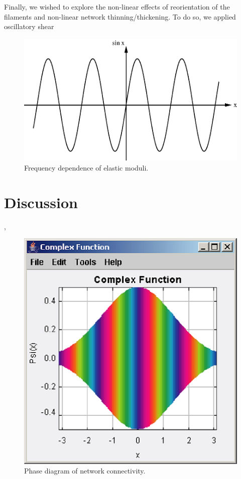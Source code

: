 \documentclass[prb,11pt]{revtex4-1}
\begin{document}
Finally, we wished to explore the non-linear effects of reorientation of the filaments and non-linear network thinning/thickening.  To do so, we applied oscillatory shear 

\begin{figure}[h!]
\centering
\includegraphics[scale=0.6]{sine}
\caption{\label{fig:freq}Frequency dependence of elastic moduli.}
\end{figure}




\section{Discussion}

{\color{blue}{Finally I wax philosophical}},
{\color{green}{but}} {\color{cyan}{who is going to pay for the ink?}}

\begin{figure}[h!]
\centering
\includegraphics[scale=0.6]{phase}
\caption{\label{fig:sim}Phase diagram of network connectivity.}
\end{figure}
\end{document}
